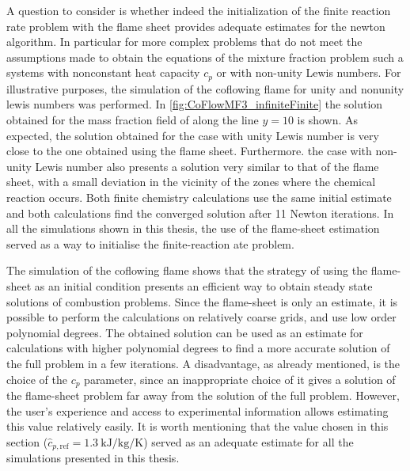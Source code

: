 A question to consider is whether indeed the initialization of the finite reaction rate problem with the flame sheet provides adequate estimates for the newton algorithm. In particular for more complex problems that do not meet the assumptions made to obtain the equations of the mixture fraction problem such a systems with nonconstant heat capacity $c_p$ or with non-unity Lewis numbers. 
For illustrative purposes, the simulation of the coflowing flame for unity and nonunity lewis numbers was performed. In \cref{fig:CoFlowMF3_infiniteFinite} the solution obtained for the mass fraction field of  along the line $y=10$ is shown. As expected, the solution obtained for the case with unity Lewis number is very close to the one obtained using the flame sheet. Furthermore. the case with non-unity Lewis number also presents a solution very similar to that of the flame sheet, with a small deviation in the vicinity of the zones where the chemical reaction occurs.  Both finite chemistry calculations use the same initial estimate and both calculations find the converged solution after 11 Newton iterations.
In all the simulations shown in this thesis, the use of the flame-sheet estimation served as a way to initialise the finite-reaction ate problem.




 
 The simulation of the coflowing flame shows that the strategy of using the flame-sheet as an initial condition presents an efficient way to obtain steady state solutions of combustion problems. Since the flame-sheet is only an estimate, it is possible to perform the calculations on relatively coarse grids, and use low order polynomial degrees. The obtained solution can be used as an estimate for calculations with higher polynomial degrees to find a more accurate solution of the full problem in a few iterations. A disadvantage, as already mentioned, is the choice of the $c_p$ parameter, since an inappropriate choice of it gives a solution of the flame-sheet problem far away from the solution of the full problem. However, the user's experience and access to experimental information allows estimating this value relatively easily. It is worth mentioning that the value chosen in this section ($\hat{c}_{p,\text{ref}}= \SI{1.3}{\kilo \joule \per \kilo \gram \per \kelvin}$)  served as an adequate estimate for all the simulations presented in this thesis.  
 
